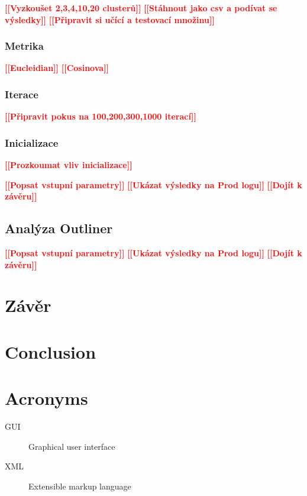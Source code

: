 \documentclass[thesis=M,czech]{FITthesis}[2012/10/20]
\newcommand{\todo}[1]{\textcolor{red}{\textbf{[[#1]]}}}
\newcommand{\blind}[1][1]{\textcolor{gray}{\Blindtext[#1][1]}}
\begin{document}
			\todo{Vyzkoušet 2,3,4,10,20 clusterů}
			\todo{Stáhnout jako csv a podívat se výsledky}
			\todo{Připravit si učící a testovací množinu}
		
		\subsection{Metrika}
			\todo{Eucleidian}
			\todo{Cosinova}
			
		\subsection{Iterace}
			\todo{Připravit pokus na 100,200,300,1000 iterací}
			
		\subsection{Inicializace}
			\todo{Prozkoumat vliv inicializace}
	
		\todo{Popsat vstupní parametry}
		\todo{Ukázat výsledky na Prod logu}	
		\todo{Dojít k závěru}						
		\blind[2]
	\section{Analýza Outliner}
		\todo{Popsat vstupní parametry}
		\todo{Ukázat výsledky na Prod logu}	
		\todo{Dojít k závěru}						
		\blind[2]

\chapter{Závěr}

\chapter{Conclusion}





\appendix

\chapter{Acronyms}
\begin{description}
	\item[GUI] Graphical user interface
	\item[XML] Extensible markup language
\end{description}
\end{document}
